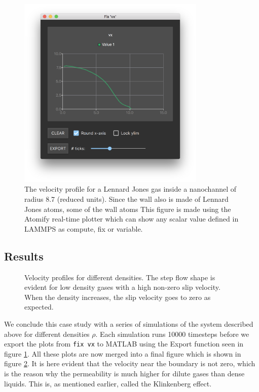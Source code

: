 \documentclass[12pt,a4paper,final]{iopart}
\newcommand{\code}[1]{\colorbox{light-gray}{\color{RawSienna}\texttt{#1}}}
\begin{document}
\begin{figure}
	\centering
	\includegraphics[width=0.8\textwidth]{lj_flow/08_velocity_profile1.png}
	\caption{
		The velocity profile for a Lennard Jones gas inside a nanochannel of radius 8.7 (reduced units).
		Since the wall also is made of Lennard Jones atoms, some of the wall atoms
		This figure is made using the Atomify real-time plotter which can show any scalar value defined in LAMMPS
		as compute, fix or variable.
    }
	\label{fig:velocity_profile1}
\end{figure}

\subsection{Results}

\begin{figure}
	\centering
	\caption{
		Velocity profiles for different densities.
		The step flow shape is evident for low density gases with a high non-zero slip velocity.
		When the density increases, the slip velocity goes to zero as expected.
    }
	\label{fig:velocity_profiles}
\end{figure}

We conclude this case study with a series of simulations of the system described above for different densities $\rho$.
Each simulation runs 10000 timesteps before we export the plots from \code{fix vx} to MATLAB using the Export function seen in figure \ref{fig:velocity_profile1}.
All these plots are now merged into a final figure which is shown in figure \ref{fig:velocity_profiles}.
It is here evident that the velocity near the boundary is not zero, which is the reason why the permeability is much higher for dilute gases than dense liquids.
This is, as mentioned earlier, called the Klinkenberg effect\cite{klinkenberg1941permeability}.
\end{document}
